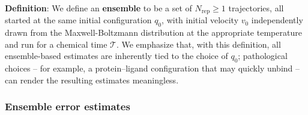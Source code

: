 



\textbf{Definition}:
We define an \textbf{ensemble} to be a set of $N_{\mathrm{rep}} \geqslant 1$ trajectories, all started at the same initial configuration $q_0$, with initial velocity $v_0$ independently drawn from the Maxwell-Boltzmann distribution at the appropriate temperature and run for a chemical time $\mathcal{T}$. We emphasize that, with this definition, all ensemble-based estimates are inherently tied to the choice of $q_0$; pathological choices  -- for example, a protein–ligand configuration that may quickly unbind -- can render the resulting estimates meaningless.

\subsubsection{Ensemble error estimates}

